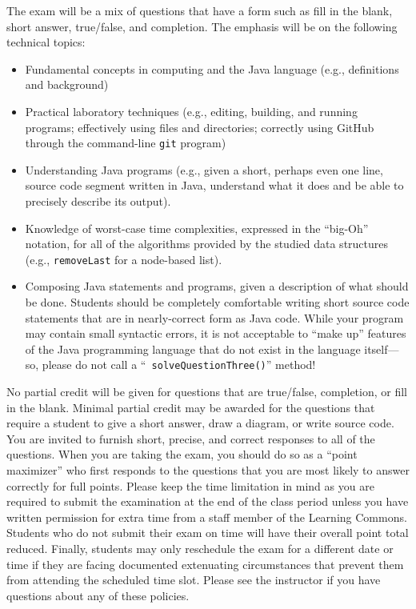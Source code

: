 \documentclass[11pt]{article}
\newcommand{\program}[1]{\lstinline{#1}}
\begin{document}
\noindent The exam will be a mix of questions that have a form such as fill in
the blank, short answer, true/false, and completion. The emphasis will be on the
following technical topics:

\vspace*{-.05in}
\begin{itemize}

  \itemsep 0in

  \item Fundamental concepts in computing and the Java language (e.g.,
    definitions and background)

  \item Practical laboratory techniques (e.g., editing, building, and running
    programs; effectively using files and directories; correctly using GitHub
    through the command-line {\tt git} program)

  \item Understanding Java programs (e.g., given a short, perhaps even one line,
    source code segment written in Java, understand what it does and be able to
    precisely describe its output).

  \item Knowledge of worst-case time complexities, expressed in the ``big-Oh''
    notation, for all of the algorithms provided by the studied data structures
    (e.g., \program{removeLast} for a node-based list).

  \item Composing Java statements and programs, given a description of what
    should be done. Students should be completely comfortable writing short
    source code statements that are in nearly-correct form as Java code. While
    your program may contain small syntactic errors, it is not acceptable to
    ``make up'' features of the Java programming language that do not exist in
    the language itself---so, please do not call a ``{\tt
    solveQuestionThree()}'' method!

\end{itemize}

\noindent No partial credit will be given for questions that are true/false,
completion, or fill in the blank. Minimal partial credit may be awarded for the
questions that require a student to give a short answer, draw a diagram, or
write source code. You are invited to furnish short, precise, and correct
responses to all of the questions. When you are taking the exam, you should do
so as a ``point maximizer'' who first responds to the questions that you are
most likely to answer correctly for full points. Please keep the time limitation
in mind as you are required to submit the examination at the end of the class
period unless you have written permission for extra time from a staff member of
the Learning Commons. Students who do not submit their exam on time will have
their overall point total reduced. Finally, students may only reschedule the
exam for a different date or time if they are facing documented extenuating
circumstances that prevent them from attending the scheduled time slot. Please
see the instructor if you have questions about any of these policies.
\end{document}
